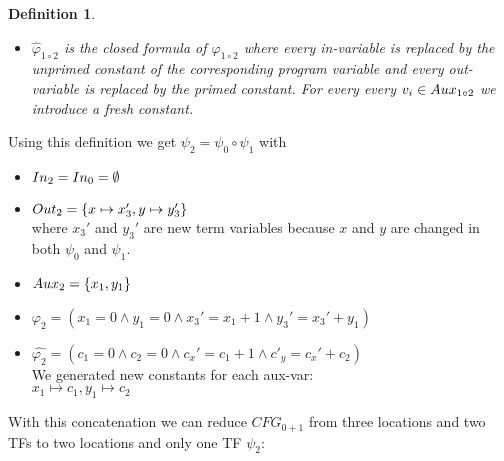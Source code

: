 \documentclass{article}
\newtheorem{mydef}{Definition}
\begin{document}
\begin{mydef}
\begin{itemize}
			\item $\widehat{\varphi}_{1 \circ 2}$ is the closed formula of $\varphi_{1 \circ 2}$ where every in-variable is replaced by the unprimed constant of the corresponding program variable and every out-variable is replaced by the primed constant. For every every $v_i \in Aux_{1 \circ 2}$ we introduce a fresh constant.
		\end{itemize}
	\end{mydef}

	\smallskip
	Using this definition we get $\psi_2 = \psi_0 \circ \psi_1$ with
	\begin{itemize}
		\item $In_2 = In_0 = \emptyset$
		\item $Out_2 = \{ x \mapsto x_3', y \mapsto y_3' \}$ \\ where $x_3'$ and $y_3'$ are new term variables because $x$ and $y$ are changed in both $\psi_0$ and $\psi_1$.
		\item $Aux_2 = \{x_1, y_1 \} $
		\item $\varphi_2 = (x_1 = 0 \land y_1 = 0 \land x_3' = x_1 + 1 \land y_3' = x_3' + y_1)$
		\item $\widehat{\varphi_2} = (c_1 = 0 \land c_2 = 0 \land c_x' = c_1 + 1 \land c'_y = c_x' + c_2)$ \\ We generated new constants for each aux-var: \\
		$x_1 \mapsto c_1, y_1 \mapsto c_2$
	\end{itemize}
	With this concatenation we can reduce $CFG_{0+1}$ from three locations and two TFs to two locations and only one TF $\psi_2$: \\
	
\end{document}
